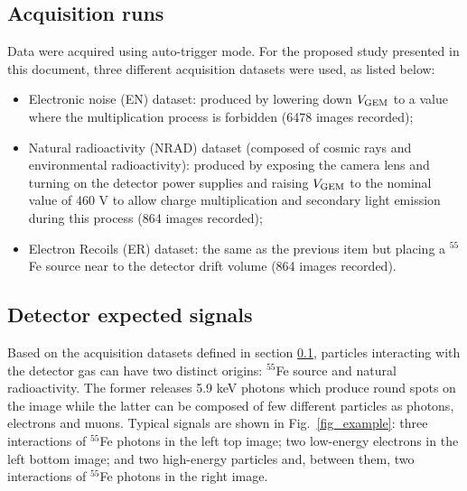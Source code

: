 \documentclass[a4paper,11pt]{article}
\begin{document}


\subsection{Acquisition runs}
\label{sec:acrRuns}

Data were acquired using auto-trigger mode. For the proposed study presented in this document, three different acquisition datasets were used, as listed below:

\begin{itemize}
    \item Electronic noise (EN) dataset: produced by lowering down $V\rm _{GEM}$ to a value where the multiplication process is forbidden (6478 images recorded);
    \item Natural radioactivity (NRAD) dataset (composed of cosmic rays and environmental radioactivity): produced by exposing the camera lens and turning on the detector power supplies and raising $V\rm _{GEM}$ to the nominal value of 460 V to allow charge multiplication and secondary light emission during this process (864 images recorded);
    \item Electron Recoils (ER) dataset: the same as the previous item but placing a $^{55}$Fe source near to the detector drift volume (864 images recorded).
\end{itemize}


\subsection{Detector expected signals}

Based on the acquisition datasets defined in section \ref{sec:acrRuns}, particles interacting with the detector gas can have two distinct origins: $^{55}$Fe source and natural radioactivity. The former releases 5.9 keV photons which produce round spots on the image while the latter can be composed of few different particles as photons, electrons and muons. 
Typical signals are shown in  Fig.~\ref{fig_example}:
three interactions of $^{55}$Fe photons in the left top image; two low-energy electrons in the left bottom image; and two high-energy particles and, between them, two interactions of $^{55}$Fe photons in the right image.
\end{document}
